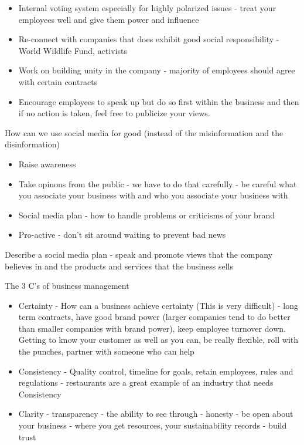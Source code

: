\documentclass[11pt]{article}
\begin{document}
\begin{itemize}
    \item Internal voting system especially for highly polarized issues - treat your employees well and give them power and influence
    \item Re-connect with companies that does exhibit good social responsibility - World Wildlife Fund, activists
    \item Work on building unity in the company - majority of employees should agree with certain contracts
    \item Encourage employees to speak up but do so first within the business and then if no action is taken, feel free to publicize your views.
\end{itemize}

How can we use social media for good (instead of the misinformation and the disinformation)

\begin{itemize}
    \item Raise awareness
    \item Take opinons from the public - we have to do that carefully - be careful what you associate your business with and who you associate your business with
    \item Social media plan - how to handle problems or criticisms of your brand
    \item Pro-active - don't sit around waiting to prevent bad news
\end{itemize}

Describe a social media plan - speak and promote views that the company believes in and the products and services that the business sells

The 3 C's of business management

\begin{itemize}
    \item Certainty - How can a business achieve certainty (This is very difficult) - long term contracts, have good brand power (larger companies tend to do better than smaller companies with brand power), keep employee turnover down. Getting to know your customer as well as you can, be really flexible, roll with the punches, partner with someone who can help
    \item Consistency - Quality control, timeline for goals, retain employees, rules and regulations - restaurants are a great example of an industry that needs Consistency
    \item Clarity - transparency - the ability to see through - honesty - be open about your business - where you get resources, your sustainability records - build trust
\end{itemize}
\end{document}
